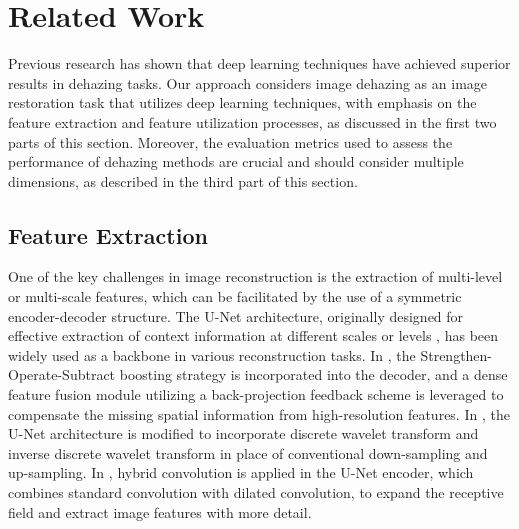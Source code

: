 \documentclass[lettersize,journal]{IEEEtran}
\begin{document}
\section{Related Work}
Previous research has shown that deep learning techniques have achieved superior results in dehazing tasks. Our approach considers image dehazing as an image restoration task that utilizes deep learning techniques, with emphasis on the feature extraction and feature utilization processes, as discussed in the first two parts of this section. Moreover, the evaluation metrics used to assess the performance of dehazing methods are crucial and should consider multiple dimensions, as described in the third part of this section.

\subsection{Feature Extraction}
One of the key challenges in image reconstruction is the extraction of multi-level or multi-scale features, which can be facilitated by the use of a symmetric encoder-decoder structure. The U-Net architecture, originally designed for effective extraction of context information at different scales or levels \cite{ronneberger2015u}, has been widely used as a backbone in various reconstruction tasks. In \cite{dong2020multi}, the Strengthen-Operate-Subtract boosting strategy is incorporated into the decoder, and a dense feature fusion module utilizing a back-projection feedback scheme is leveraged to compensate the missing spatial information from high-resolution features. In \cite{yang2019wavelet}, the U-Net architecture is modified to incorporate discrete wavelet transform and inverse discrete wavelet transform in place of conventional down-sampling and up-sampling. In \cite{feng2021urnet}, hybrid convolution is applied in the U-Net encoder, which combines standard convolution with dilated convolution, to expand the receptive field and extract image features with more detail.
\end{document}
